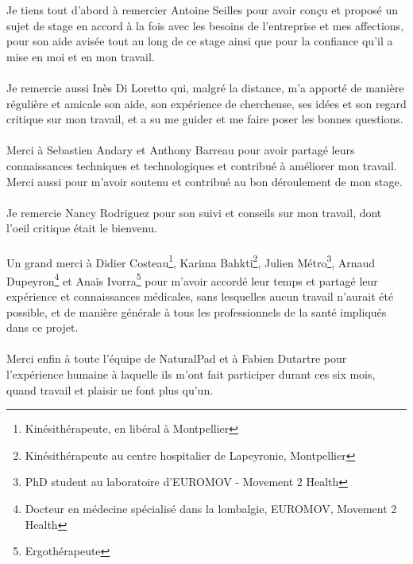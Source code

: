 Je tiens tout d'abord à remercier Antoine Seilles pour avoir conçu et proposé un sujet de stage en accord à la fois avec les besoins de l'entreprise et mes affections, pour son aide avisée tout au long de ce stage ainsi que pour la confiance qu'il a mise en moi et en mon travail.

\paragraph{}Je remercie aussi Inès Di Loretto qui, malgré la distance, m'a apporté de manière régulière et amicale son aide, son expérience de chercheuse, ses idées et son regard critique sur mon travail, et a su me guider et me faire poser les bonnes questions.

\paragraph{}Merci à Sebastien Andary et Anthony Barreau pour avoir partagé leurs connaissances techniques et technologiques et contribué à améliorer mon travail. Merci aussi pour m'avoir soutenu et contribué au bon déroulement de mon stage.

\paragraph{}Je remercie Nancy Rodriguez pour son suivi et conseils sur mon travail, dont l'oeil critique était le bienvenu.

\paragraph{}Un grand merci à Didier Costeau\footnote{Kinésithérapeute, en libéral à Montpellier}, Karima Bahkti\footnote{Kinésithérapeute au centre hospitalier de Lapeyronie, Montpellier}, Julien Métro\footnote{PhD student au laboratoire d'EUROMOV - Movement 2 Health}, Arnaud Dupeyron\footnote{Docteur en médecine spécialisé dans la lombalgie, EUROMOV, Movement 2 Health} et Anaïs Ivorra\footnote{Ergothérapeute} pour m'avoir accordé leur temps et partagé leur expérience et connaissances médicales, sans lesquelles aucun travail n'aurait été possible, et de manière générale à tous les professionnels de la santé impliqués dans ce projet.

\paragraph{}Merci enfin à toute l'équipe de NaturalPad et à Fabien Dutartre pour l'expérience humaine à laquelle ils m'ont fait participer durant ces six mois, quand travail et plaisir ne font plus qu'un.
